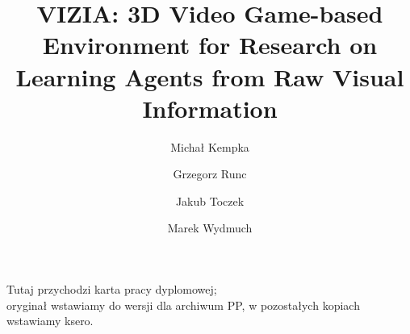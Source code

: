 \documentclass[english,bachelor,a4paper,twoside]{ppfcmthesis}
\author{%
   Michał Kempka \album{105256} \and 
   Grzegorz Runc \album{109759} \and 
   Jakub Toczek \album{109704} \and 
   Marek Wydmuch \album{109746}}
\title{VIZIA: 3D Video Game-based Environment for Research on Learning Agents from Raw Visual Information}        %
\begin{document}
\frontmatter\pagestyle{empty}%
\maketitle\cleardoublepage%

\thispagestyle{empty}\vspace*{\fill}%
\begin{center}Tutaj przychodzi karta pracy dyplomowej;\\oryginał wstawiamy do wersji dla archiwum PP, w pozostałych kopiach wstawiamy ksero.\end{center}%
\vfill\cleardoublepage%



\cleardoublepage

\pagestyle{ppfcmthesis}%
\tableofcontents* \cleardoublepage%

\mainmatter%










{\raggedright\sloppy\small}

\cleardoublepage\appendix%
%




\ppcolophon
\end{document}
